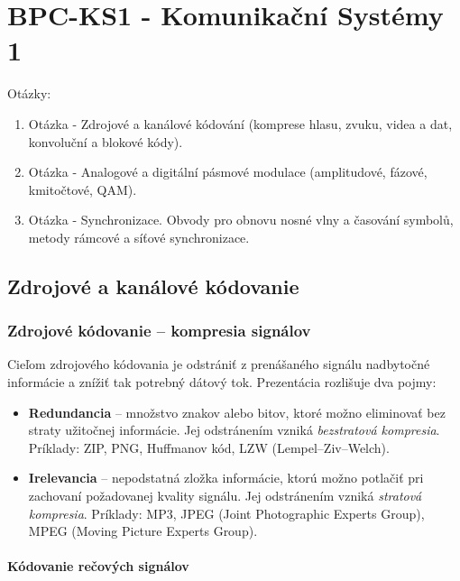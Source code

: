 \part{BPC-KS1 - Komunikační Systémy 1}
\begin{huge}
	Otázky:
	\newline
\end{huge}
\begin{enumerate}
	\item Otázka - Zdrojové a kanálové kódování (komprese hlasu, zvuku, videa a dat, konvoluční a blokové kódy).
	\item Otázka - Analogové a digitální pásmové modulace (amplitudové, fázové, kmitočtové, QAM). 
	\item Otázka - Synchronizace. Obvody pro obnovu nosné vlny a časování symbolů, metody rámcové a síťové synchronizace. 
\end{enumerate}

\chapter{Zdrojové a kanálové kódovanie}

\section{Zdrojové kódovanie -- kompresia signálov}

Cieľom zdrojového kódovania je odstrániť z prenášaného signálu nadbytočné
informácie a znížiť tak potrebný dátový tok. Prezentácia rozlišuje dva pojmy:

\begin{itemize}
    \item \textbf{Redundancia} -- množstvo znakov alebo bitov, ktoré možno eliminovať bez
        straty užitočnej informácie. Jej odstránením vzniká \textit{bezstratová kompresia}.
        Príklady: ZIP, PNG, Huffmanov kód, LZW (Lempel--Ziv--Welch).
    \item \textbf{Irelevancia} -- nepodstatná zložka informácie, ktorú možno potlačiť pri
        zachovaní požadovanej kvality signálu. Jej odstránením vzniká \textit{stratová kompresia}.
        Príklady: MP3, JPEG (Joint Photographic Experts Group), MPEG (Moving Picture Experts Group).
\end{itemize}

\subsection{Kódovanie rečových signálov}

